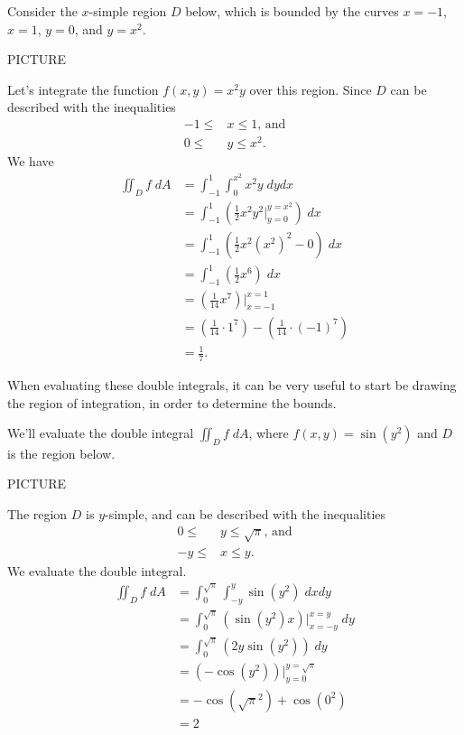 \documentclass{ximera}
\begin{document}
\begin{example}
Consider the $x$-simple region $D$ below, which is bounded by the curves $x=-1$, $x=1$, $y=0$, and $y=x^2$. 

PICTURE

Let's integrate the function $f(x,y)=x^2y$ over this region. Since $D$ can be described with the inequalities
\begin{align*}
-1\leq &x\leq 1\text{, and}\\
0\leq &y\leq x^2.
\end{align*}
We have
\begin{align*}
\iint_D f\;dA &= \int_{-1}^1\int_0^{x^2}x^2y\;dydx\\
&=\int_{-1}^1\left(\frac{1}{2}x^2y^2|_{y=0}^{y=x^2}\right)\;dx\\
&= \int_{-1}^1\left(\frac{1}{2}x^2(x^2)^2 - 0\right)\;dx\\
&= \int_{-1}^1\left(\frac{1}{2}x^6\right)\;dx\\
&= \left(\frac{1}{14}x^7\right)|_{x=-1}^{x=1}\\
&= \left(\frac{1}{14}\cdot 1^7\right) - \left(\frac{1}{14}\cdot (-1)^7\right)\\
&= \frac{1}{7}.
\end{align*}
\end{example}

When evaluating these double integrals, it can be very useful to start be drawing the region of integration, in order to determine the bounds.

\begin{example}
We'll evaluate the double integral $\iint_D f\;dA$, where $f(x,y) = \sin(y^2)$ and $D$ is the region below.

PICTURE

The region $D$ is $y$-simple, and can be described with the inequalities
\begin{align*}
0\leq &y\leq \sqrt{\pi}\text{, and}\\
-y\leq &x\leq y.
\end{align*}
We evaluate the double integral.
\begin{align*}
\iint_D f\;dA &= \int_0^{\sqrt{\pi}}\int_{-y}^y \sin(y^2)\;dxdy\\
&= \int_0^{\sqrt{\pi}}\left(\sin(y^2)x\right)|_{x={-y}}^{x=y}\;dy\\
&= \int_0^{\sqrt{\pi}}\left(2y\sin(y^2)\right)\;dy\\
&= \left(-\cos(y^2)\right)|_{y=0}^{y=\sqrt{\pi}}\\
&= -\cos(\sqrt{\pi}^2) + \cos(0^2)\\
&= 2
\end{align*}
\end{example}
\end{document}
